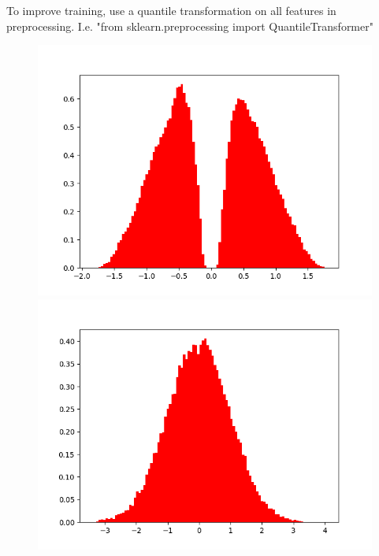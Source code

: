 To improve training, use a quantile transformation on all features in preprocessing. I.e. "from sklearn.preprocessing import QuantileTransformer"
\begin{figure}[htb]
    \centering
    \begin{minipage}{.3\textwidth}
    
        \centering
        \includegraphics[width=.99\textwidth,trim={3cm 0 0 0},clip]{Chapters/Ch3-Simulations/normalizing_flows/pics/MeetingFigures/Bobby/QT/feature0_noQT.png}
        \includegraphics[width=.99\textwidth,trim={3cm 0 0 0},clip]{Chapters/Ch3-Simulations/normalizing_flows/pics/MeetingFigures/Bobby/QT/feature0.png}


\end{minipage}
\end{figure}
